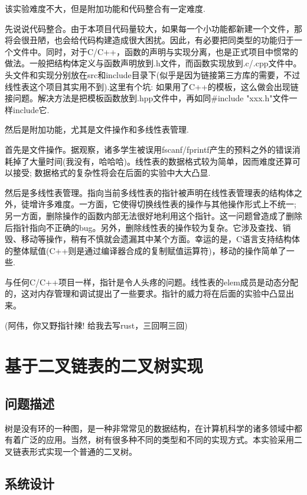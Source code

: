 \documentclass[supercite]{Experimental_Report}
\theoremstyle{definition}
\begin{document}
该实验难度不大，但是附加功能和代码整合有一定难度.

先说说代码整合。由于本项目代码量较大，如果每一个小功能都新建一个文件，那将会很丑陋，也会给代码构建造成很大困扰。因此，有必要把同类型的功能归于一个文件中。同时，对于C/C++，函数的声明与实现分离，也是正式项目中惯常的做法。一般把结构体定义与函数声明放到.h文件，而函数实现放到.c/.cpp文件中。头文件和实现分别放在src和include目录下(似乎是因为链接第三方库的需要，不过线性表这个项目其实用不到).这里有个坑: 如果用了C++的模板，这么做会出现链接问题。解决方法是把模板函数放到.hpp文件中，再如同\#include "xxx.h"文件一样include它.

然后是附加功能，尤其是文件操作和多线性表管理.

首先是文件操作。据观察，诸多学生被误用fscanf/fprintf产生的预料之外的错误消耗掉了大量时间(我没有，哈哈哈)。线性表的数据格式较为简单，因而难度还算可以接受; 数据格式的复杂性将会在后面的实验中大大凸显.

然后是多线性表管理。指向当前多线性表的指针被声明在线性表管理表的结构体之外，徒增许多难度。一方面，它使得切换线性表的操作与其他操作形式上不统一; 另一方面，删除操作的函数内部无法很好地利用这个指针。这一问题曾造成了删除后指针指向不正确的bug。另外，删除线性表的操作较为复杂。它涉及查找、销毁、移动等操作，稍有不慎就会遗漏其中某个方面。幸运的是，C语言支持结构体的整体赋值(C++则是通过编译器合成的复制赋值运算符\cite{CopyAssignmentCppReference})，移动的操作简单了一些.

与任何C/C++项目一样，指针是令人头疼的问题。线性表的elem成员是动态分配的，这对内存管理和调试提出了一些要求。指针的威力将在后面的实验中凸显出来。

(阿伟，你又野指针辣! 给我去写rust，三回啊三回)

\newpage


\section{基于二叉链表的二叉树实现}

\subsection{问题描述}

树是没有环的一种图，是一种非常常见的数据结构，在计算机科学的诸多领域中都有着广泛的应用。当然，树有很多种不同的类型和不同的实现方式。本实验采用二叉链表形式实现一个普通的二叉树。 \\

\subsection{系统设计}
\end{document}
